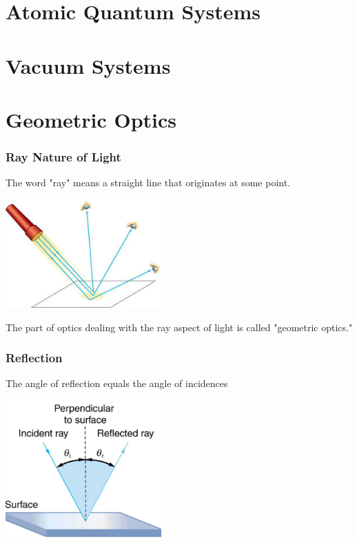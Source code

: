\documentclass{beamer}
\begin{document}
\section{Atomic Quantum Systems}

\section{Vacuum Systems}


\section{Geometric Optics}

\begin{frame}\frametitle{Ray Nature of Light}
The word "ray" means a straight line that originates at some point.

\begin{center}
\includegraphics[width=6cm]{fig/rays.jpg}
\end{center}

The part of optics dealing with the ray aspect of light is called "geometric optics."

\end{frame}


\begin{frame}\frametitle{Reflection}
The angle of reflection equals the angle of incidences

\begin{center}
\includegraphics[width=6cm]{fig/reflect.png}
\end{center}

\end{frame}
\end{document}

